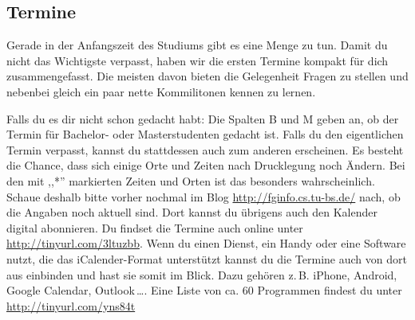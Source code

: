 \subsection{Termine}
\label{termine}
	\begin{multicols}{2}
	Gerade in der Anfangszeit des Studiums gibt es eine Menge zu tun. Damit du
	nicht das Wichtigste verpasst, haben wir die ersten Termine kompakt für
	dich zusammengefasst. Die meisten davon bieten die Gelegenheit Fragen zu
	stellen und nebenbei gleich ein paar nette Kommilitonen kennen zu lernen.

	Falls du  es dir nicht schon gedacht habt: Die Spalten B und M geben an,
	ob der Termin für Bachelor- oder Masterstudenten gedacht
        ist. Falls du den eigentlichen Termin verpasst, kannst du
        stattdessen auch zum anderen erscheinen. Es besteht die Chance, dass sich einige Orte
	und Zeiten
	nach Drucklegung noch Ändern.  Bei den mit ,,*'' markierten Zeiten und
	Orten ist das besonders wahrscheinlich. Schaue deshalb bitte vorher
	nochmal im Blog \url{http://fginfo.cs.tu-bs.de/} nach, ob die Angaben
	noch aktuell sind. Dort kannst du übrigens auch den Kalender digital abonnieren.
	Du findset die Termine auch online unter \url{http://tinyurl.com/3ltuzbb}.
	Wenn du einen Dienst, ein Handy oder eine Software nutzt, die das iCalender-Format unterstützt
	kannst du die Termine auch von dort aus einbinden und hast sie somit im Blick. 
	Dazu gehören z.\,B. iPhone, Android, Google Calendar, Outlook\,\dots. Eine Liste 
	von ca. 60 Programmen findest du unter 	\url{http://tinyurl.com/yns84t}
	\end{multicols}

